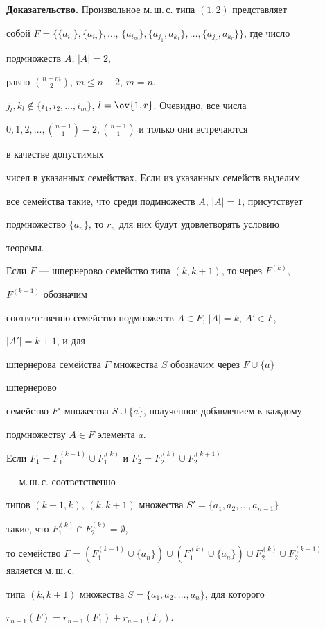  


{\bf Доказательство.} Произвольное м.\,ш.\,с. типа $(1,2)$ представляет 


собой $F=\big\{\{a_{i_1}\},\{a_{i_2}\},\dotsc$, $\{a_{i_m}\}, 




\{a_{j_1},a_{k_1}\},\dotsc, \{a_{j_r},a_{k_r}\}\big\}$, где число 


подмножеств $A$, $|A|=2$, 


равно $\binom{n-m}{2}$, $m\le n-2$, $m=n$, 


$j_l,k_l\notin\{i_1,i_2,\dotsc,i_m\}$, $l=\ov{1,r}$. Очевидно, все числа 


$0,1,2,\dotsc, \binom{n-1}{1}-2, \binom{n-1}{1}$ и только они встречаются 


в качестве допустимых 


чисел в указанных семействах. Если из указанных семейств выделим 


все семейства такие, что среди подмножеств $A$, $|A|=1$, присутствует 


подмножество $\{a_n\}$, то $r_n$ для них будут удовлетворять условию 


теоремы. 


 


Если $F$ --- шпернерово семейство типа $(k,k+1)$, то через $F^{(k)}$, 


$F^{(k+1)}$ обозначим 


соответственно семейство подмножеств $A\in F$, $|A|=k$, $A'\in F$, 


$|A'|=k+1$, и для 


шпернерова семейства $F$ множества $S$ обозначим через $F\cup\{a\}$ 


шпернерово 


семейство $F'$ множества $S\cup\{a\}$, полученное добавлением к каждому 


подмножеству $A\in F$ элемента $a$. 


 


 


\begin{lemnonum} 


Если $F_1=F_1^{(k-1)}\cup F_1^{(k)}$ и $F_2=F_2^{(k)}\cup F_2^{(k+1)}$ 


--- м.\,ш.\,с. соответственно 


типов $(k-1,k)$, $(k,k+1)$ множества $S'=\{a_1,a_2,\dotsc,a_{n-1}\}$ 


такие, что $F_1^{(k)}\cap F_2^{(k)}=\emptyset$, 


то семейство $F=(F_1^{(k-1)}\cup\{a_n\})\cup (F_1^{(k)}\cup \{a_n\}) \cup 


F_2^{(k)}\cup F_2^{(k+1)}$ является м.\,ш.\,с. 


типа $(k,k+1)$ множества $S=\{a_1,a_2,\dotsc,a_n\}$, для которого 


$r_{n-1}(F)=r_{n-1}(F_1)+r_{n-1}(F_2)$. 


\end{lemnonum} 


